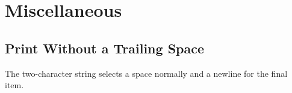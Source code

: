 \section{Miscellaneous}

\subsection{Print Without a Trailing Space}

The two-character string selects a space normally and a newline for the final item.


